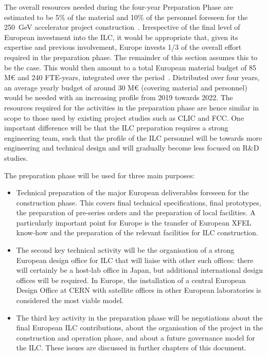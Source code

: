 \documentclass[%
 reprint,
 floatfix,
 amsmath,amssymb,
 aps,
]{revtex4-1}
\begin{document}
The overall resources needed during the four-year Preparation Phase are estimated to be 5\% of the material and 10\% of the personnel 
foreseen for the 250~GeV accelerator project construction~\cite{Evans:2017rvt}. Irrespective of the final level of European investment into the ILC,
it would be appropriate that, given its expertise and previous involvement, Europe invests 1/3 of the overall effort required in the 
preparation phase. The remainder of this section assumes this to be the case. This would then amount to a total European material 
budget of 85 M\euro{} and 240 FTE-years, integrated over the period~\cite{ejade-report}.
Distributed over four years, an average yearly budget of around 30 M\euro{} (covering material and personnel) would be needed with an 
increasing profile from 2019 towards 2022. The resources required for the activities in the preparation phase are hence similar in 
scope to those used by existing project studies such as CLIC and FCC. One important difference will be that the ILC preparation 
requires a strong engineering team, such that the profile of the ILC personnel will be towards more engineering and technical 
design and will gradually become less focused on R\&D studies.

The preparation phase will be used for three main purposes:

\begin{itemize}
\item 
Technical preparation of the major European deliverables foreseen for the construction phase. 
This covers final technical specifications, final prototypes, the preparation of pre-series orders and the preparation of local 
facilities. A particularly important point for Europe is the transfer of European XFEL know-how and the preparation of the 
relevant facilities for ILC construction.
\item
The second key technical activity will be the organisation of a strong European design office for ILC that will liaise with 
other such offices: there will certainly be a host-lab office in Japan, but additional international design offices will be 
required. In Europe, the installation of a central European Design Office at CERN with satellite offices in other European laboratories is considered the most viable model.
\item 
The third key activity in the preparation phase will be negotiations about the final European ILC contributions, about the 
organisation of the project in the construction and operation phase, and about a future governance model for the ILC. 
These issues are discussed in further chapters of this document.
\end{itemize}
\end{document}
